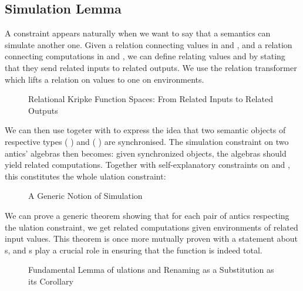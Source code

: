 \subsection{Simulation Lemma}

A  constraint appears naturally when we want to say that a
semantics can simulate another one. Given a relation connecting values
in  and , and a relation connecting computations in
 and , we can define  relating values
   and   
by stating that they send related inputs to related outputs. We use
the relation transformer  which lifts a relation on values
to one on environments.

\begin{figure}[h]
\caption{Relational Kripke Function Spaces: From Related Inputs to Related Outputs}
\end{figure}

We can then use  togeter with  to express the idea
that two semantic objects of respective types
   (  ) and
   (  ) are
synchronised. The simulation constraint on two antics' algebras
then becomes: given synchronized objects, the algebras should yield
related computations. Together with self-explanatory constraints on
 and , this constitutes the whole ulation
constraint:

\begin{figure}[h]
\caption{A Generic Notion of Simulation}
\end{figure}

We can prove a generic theorem showing that for each pair of antics
respecting the ulation constraint, we get related computations given
environments of related input values. This theorem is once more mutually
proven with a statement about s, and s play a crucial
role in ensuring that the function is indeed total.

\begin{figure}[h]
\caption{Fundamental Lemma of ulations and Renaming as a Substitution as its Corollary}
\end{figure}

